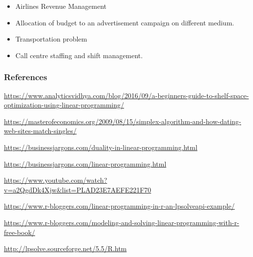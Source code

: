 \documentclass[]{article}
\begin{document}
\begin{itemize}
\item
  Airlines Revenue Management
\item
  Allocation of budget to an advertisement campaign on different medium.
\item
  Transportation problem
\item
  Call centre staffing and shift management.
\end{itemize}

\subsubsection{References}\label{references}

\url{https://www.analyticsvidhya.com/blog/2016/09/a-beginners-guide-to-shelf-space-optimization-using-linear-programming/}

\url{https://masterofeconomics.org/2009/08/15/simplex-algorithm-and-how-dating-web-sites-match-singles/}

\url{https://businessjargons.com/duality-in-linear-programming.html}

\url{https://businessjargons.com/linear-programming.html}

\url{https://www.youtube.com/watch?v=a2QgdDk4Xjw\&list=PLAD23E7AEFE221F70}

\url{https://www.r-bloggers.com/linear-programming-in-r-an-lpsolveapi-example/}

\url{https://www.r-bloggers.com/modeling-and-solving-linear-programming-with-r-free-book/}

\url{http://lpsolve.sourceforge.net/5.5/R.htm}
\end{document}
